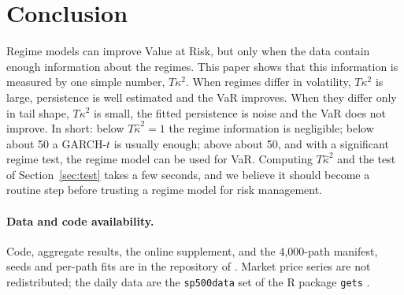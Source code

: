 \documentclass[12pt,letterpaper]{article}
\newcommand{\todo}[1]{{\color{red}[TODO: #1]}}
\theoremstyle{plain}
\theoremstyle{remark}
\begin{document}
\section{Conclusion}
Regime models can improve Value at Risk, but only when the data contain enough information about the regimes. This paper shows that this information is measured by one simple number, $T\kappa^2$. When regimes differ in volatility, $T\kappa^2$ is large, persistence is well estimated and the VaR improves. When they differ only in tail shape, $T\kappa^2$ is small, the fitted persistence is noise and the VaR does not improve. In short: below $T\hat\kappa^2=1$ the regime information is negligible; below about 50 a GARCH-$t$ is usually enough; above about 50, and with a significant regime test, the regime model can be used for VaR. Computing $T\hat\kappa^2$ and the test of Section~\ref{sec:test} takes a few seconds, and we believe it should become a routine step before trusting a regime model for risk management.


\paragraph{Data and code availability.} Code, aggregate results, the online supplement, and the 4{,}000-path manifest, seeds and per-path fits are in the repository of \citet{giorno2026code}. Market price series are not redistributed; the daily data are the \texttt{sp500data} set of the R package \texttt{gets} \citep{pretis2018}.
\end{document}
